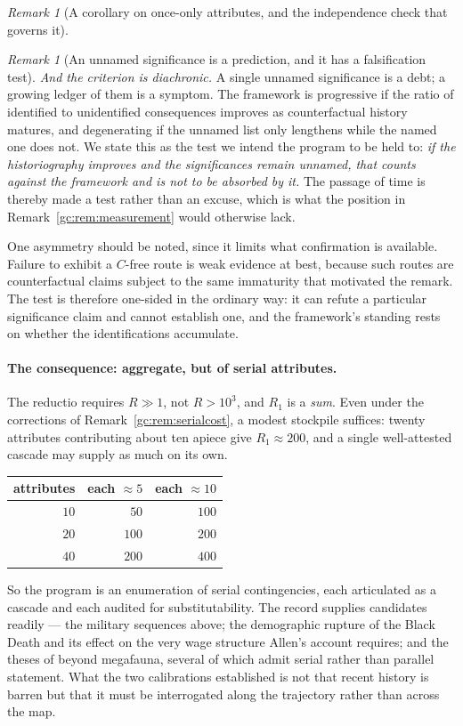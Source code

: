 \documentclass[11pt]{article}
\numberwithin{equation}{section}
\theoremstyle{plain}
\theoremstyle{definition}
\theoremstyle{remark}
\newtheorem{remark}[theorem]{Remark}
\begin{document}
\begin{remark}[A corollary on once-only attributes, and the independence
check that governs it]
\begin{remark}[An unnamed significance is a prediction, and it has a
falsification test]
\emph{And the criterion is diachronic.} A single unnamed significance
is a debt; a growing ledger of them is a symptom. The framework is
progressive if the ratio of identified to unidentified consequences
improves as counterfactual history matures, and degenerating if the
unnamed list only lengthens while the named one does not. We state this
as the test we intend the program to be held to: \emph{if the
historiography improves and the significances remain unnamed, that
counts against the framework and is not to be absorbed by it.} The
passage of time is thereby made a test rather than an excuse, which is
what the position in Remark~\ref{gc:rem:measurement} would otherwise
lack.

One asymmetry should be noted, since it limits what confirmation is
available. Failure to exhibit a $C$-free route is weak evidence at best,
because such routes are counterfactual claims subject to the same
immaturity that motivated the remark. The test is therefore one-sided in
the ordinary way: it can refute a particular significance claim and
cannot establish one, and the framework's standing rests on
whether the identifications accumulate.
\end{remark}

\paragraph{The consequence: aggregate, but of serial attributes.} The
reductio requires $R\gg1$, not $R>10^{3}$, and $R_1$ is a \emph{sum}.
Even under the corrections of Remark~\ref{gc:rem:serialcost}, a modest
stockpile suffices: twenty attributes contributing about ten apiece
give $R_1\approx200$, and a single well-attested cascade may supply as
much on its own.

\begin{center}\small
\begin{tabular}{@{}rrr@{}}
\toprule
attributes & each $\approx5$ & each $\approx10$\\
\midrule
$10$ & $50$ & $100$\\
$20$ & $100$ & $200$\\
$40$ & $200$ & $400$\\
\bottomrule
\end{tabular}
\end{center}

\noindent So the program is an enumeration of serial contingencies,
each articulated as a cascade and each audited for substitutability. The
record supplies candidates readily --- the military sequences above; the
demographic rupture of the Black Death and its effect on the very wage
structure Allen's account requires; and the theses of \cite{Diamond97}
beyond megafauna, several of which admit serial rather than parallel
statement. What the two calibrations established is not that recent
history is barren but that it must be interrogated along the trajectory
rather than across the map.


\end{remark}
\end{document}
